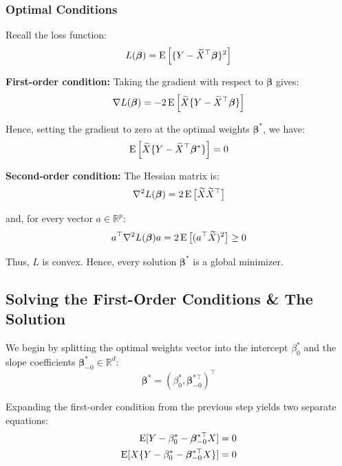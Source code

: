 \subsubsection{Optimal Conditions}
Recall the loss function:
\begin{equation*}
    L(\bm\beta) = \operatorname{E} \Big[\{Y-\widetilde{X}^\top\bm\beta\}^2\Big]
\end{equation*}

\textbf{First-order condition:} Taking the gradient with respect to $\bm\beta$ gives:
\begin{equation*}
    \nabla L(\bm\beta) = -2\operatorname{E} \Big[\widetilde{X}\{Y-\widetilde{X}^\top\bm\beta\}\Big]
\end{equation*} 

Hence, setting the gradient to zero at the optimal weights $\bm\beta^*$, we have:
\begin{equation*}
    \operatorname{E} \Big[\widetilde{X}\{Y-\widetilde{X}^\top\bm\beta^*\}\Big] = 0
\end{equation*}

\textbf{Second-order condition:} The Hessian matrix is:
\begin{equation*}
    \nabla^2 L(\bm\beta) = 2\operatorname{E} \big[\widetilde{X}\widetilde{X}^\top\big]
\end{equation*}

and, for every vector $a \in \mathbb{R}^p$:
\begin{equation*}
    a^\top \nabla^2 L(\bm\beta) a = 2\operatorname{E} \big[(a^\top \widetilde{X})^2\big] \geq 0
\end{equation*}

Thus, $L$ is convex. Hence, every solution $\bm\beta^*$ is a global minimizer.

\subsection*{Solving the First-Order Conditions \& The Solution}

We begin by splitting the optimal weights vector into the intercept $\beta_0^*$ and the slope coefficients $\bm\beta_{-0}^* \in \mathbb{R}^d$:
\begin{equation*}
    \bm\beta^* = (\beta_0^*, \bm\beta_{-0}^{*\top})^\top
\end{equation*}

Expanding the first-order condition from the previous step yields two separate equations:
\begin{align*}
    \operatorname{E}[Y - \beta_0^* - \bm\beta_{-0}^{*\top}X] &= 0 \\
    \operatorname{E}[X\{Y - \beta_0^* - \bm\beta_{-0}^{*\top}X\}] &= 0
\end{align*}

